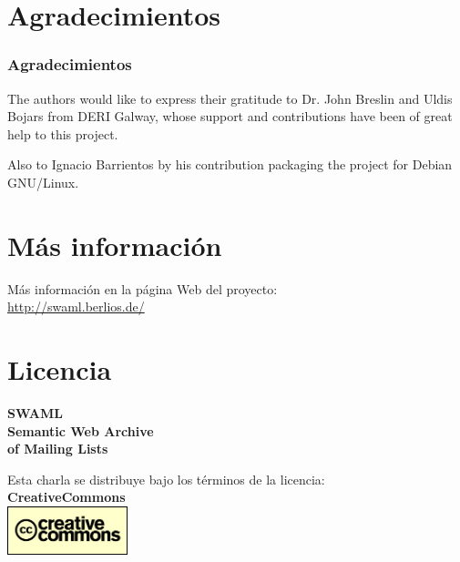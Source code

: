 \documentclass[spanish,notes=hide]{beamer}
\begin{document}
\appendix

\section{Agradecimientos}
\frame
{
  \frametitle{Agradecimientos}
  
  \begin{Large}
    The authors would like to express their gratitude to Dr. John Breslin and 
    Uldis Bojars from DERI Galway, whose support and contributions have been 
    of great help to this project. 
  \end{Large}

  \vspace{1cm}

  \begin{Large}
    Also to Ignacio Barrientos by his contribution packaging the project for 
    Debian GNU/Linux.
  \end{Large}
}

\section{Más información}
\frame
{
  \begin{center}
    Más información en la página Web del proyecto:\\
    \vspace{1cm}
    \LARGE{\href{http://swaml.berlios.de/}{http://swaml.berlios.de/}}\\
  \end{center}

}

\section{Licencia}
\frame
{
  \begin{center}
    \LARGE{%
	\textbf{SWAML}\\
	\textbf{Semantic Web Archive\\of Mailing Lists}
    }\\
    \vspace{1cm}
    \vspace{1cm}
    \begin{tiny}
	Esta charla se distribuye bajo los términos de la licencia:\\
	\textbf{CreativeCommons}\\
	\includegraphics[width=3.5cm]{images/creativecommons.png}
    \end{tiny}
  \end{center}
}
\end{document}
